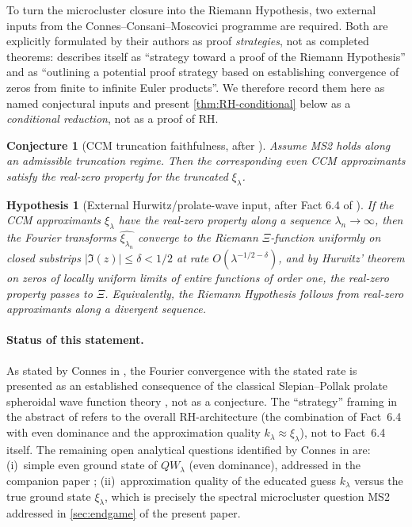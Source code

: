 \documentclass[12pt,a4paper]{article}
\newtheorem{conjecture}[theorem]{Conjecture}
\newtheorem{hypothesis}[theorem]{Hypothesis}
\theoremstyle{definition}
\theoremstyle{remark}
\begin{document}
To turn the microcluster closure into the Riemann Hypothesis, two
external inputs from the Connes--Consani--Moscovici programme are
required.  Both are explicitly formulated by their authors as proof
\emph{strategies}, not as completed theorems: \cite{CCM2025} describes
itself as ``strategy toward a proof of the Riemann Hypothesis'' and
\cite{Connes2026} as ``outlining a potential proof strategy based on
establishing convergence of zeros from finite to infinite Euler
products''.  We therefore record them here as named conjectural
inputs and present \cref{thm:RH-conditional} below as a
\emph{conditional reduction}, not as a proof of RH.

\begin{conjecture}[CCM truncation faithfulness, after \cite{CCM2025,Connes2026}]
\label{conj:ccm-blackbox}
Assume MS2 holds along an admissible truncation regime.  Then the
corresponding even CCM approximants satisfy the real-zero property for
the truncated $\xi_\lambda$.
\end{conjecture}

\begin{hypothesis}[External Hurwitz/prolate-wave input, after Fact 6.4 of \cite{Connes2026}]
\label{conj:hurwitz-blackbox}
If the CCM approximants $\xi_\lambda$ have the real-zero property along
a sequence $\lambda_n \to \infty$, then the Fourier transforms
$\widehat{\xi_{\lambda_n}}$ converge to the Riemann $\Xi$-function
uniformly on closed substrips $|\Im(z)| \le \delta < 1/2$ at rate
$O(\lambda^{-1/2-\delta})$, and by Hurwitz' theorem on zeros of
locally uniform limits of entire functions of order one, the
real-zero property passes to $\Xi$.  Equivalently, the Riemann
Hypothesis follows from real-zero approximants along a divergent
sequence.
\end{hypothesis}

\paragraph{Status of this statement.}  As stated by Connes in
\cite[Fact~6.4 of §6.5]{Connes2026}, the Fourier convergence with
the stated rate is presented as an established consequence of the
classical Slepian--Pollak prolate spheroidal wave function theory
\cite[Theorem~1 of reference~47]{Connes2026}, not as a conjecture.
The ``strategy'' framing in the abstract of \cite{Connes2026} refers
to the overall RH-architecture (the combination of Fact~6.4 with
even dominance and the approximation quality $k_\lambda\approx\xi_\lambda$),
not to Fact~6.4 itself.  The remaining open analytical questions
identified by Connes in \cite[§6.6]{Connes2026} are: (i)~simple
even ground state of $QW_\lambda$ (even dominance), addressed in the
companion paper \cite{Geiger2026evendom}; (ii)~approximation
quality of the educated guess $k_\lambda$ versus the true ground
state $\xi_\lambda$, which is precisely the spectral microcluster
question MS2 addressed in \cref{sec:endgame} of the present paper.
\end{document}
